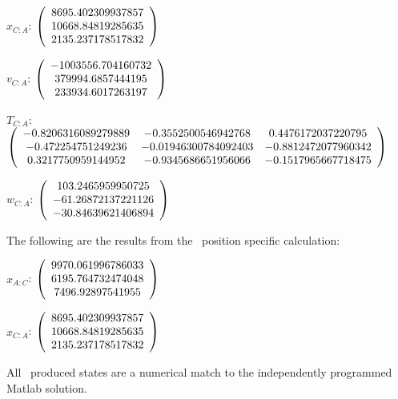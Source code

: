 \begin{description}
$x_{C:A}$: $\left( \begin{array} {ccc} 8695.402309937857 \\     10668.84819285635 \\     2135.237178517832
\end{array} \right)\\ \\$

$v_{C:A}$:  $\left( \begin{array} {ccc} -1003556.704160732 \\     379994.6857444195 \\     233934.6017263197
\end{array} \right)\\ \\$

$T_{C:A}$: $\left( \begin{array} {ccc}
 -0.8206316089279889 &   -0.3552500546942768 &    0.4476172037220795 \\
  -0.472254751249236 &  -0.01946300784092403 &   -0.8812472077960342 \\
  0.3217750959144952 &   -0.9345686651956066 &   -0.1517965667718475 \\
\end{array} \right)\\ \\$

$w_{C:A}$:  $\left( \begin{array} {ccc} 103.2465959950725 \\    -61.26872137221126 \\    -30.84639621406894
\end{array} \right)\\ \\$


The following are the results from the \ position specific calculation:

$x_{A:C}$: $\left( \begin{array} {ccc} 9970.061996786033 \\     6195.764732474048 \\      7496.92897541955
\end{array} \right)\\ \\$

$x_{C:A}$: $\left( \begin{array} {ccc} 8695.402309937857 \\     10668.84819285635 \\     2135.237178517832
\end{array} \right)\\ \\$

All \ produced states are a numerical match to the independently programmed Matlab solution.

\end{description}

